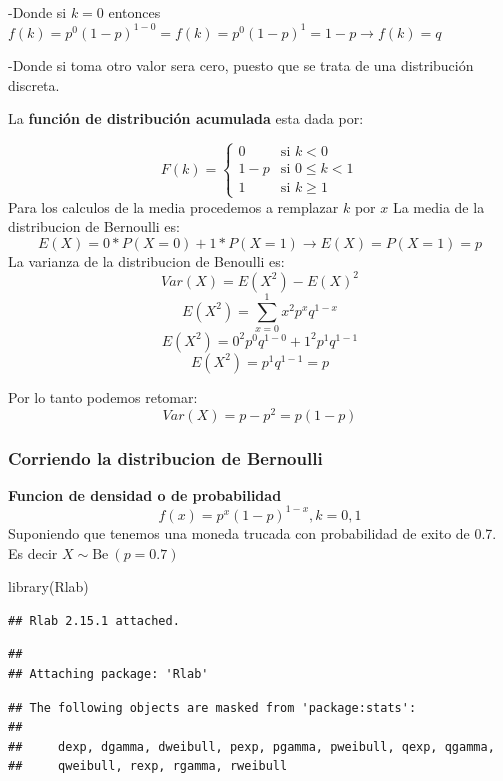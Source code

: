 \documentclass[
]{article}
\newenvironment{Shaded}{\begin{snugshade}}{\end{snugshade}}
\newcommand{\FunctionTok}[1]{\textcolor[rgb]{0.00,0.00,0.00}{#1}}
\newcommand{\NormalTok}[1]{#1}
\begin{document}
-Donde si \(k=0\) entonces
\(f(k)=p^0(1-p)^{1-0}=f(k)=p^0(1-p)^{1}=1-p\longrightarrow f(k)=q\)

-Donde si toma otro valor sera cero, puesto que se trata de una
distribución discreta.

La \textbf{función de distribución acumulada} esta dada por:

\[F(k) = \left\{
\begin{array}{rl}
     0 & \text{si } k<0 
  \\ 1-p & \text{si } 0\le k<1
  \\ 1 & \text{si } k\ge 1
\end{array}
\right.\] Para los calculos de la media procedemos a remplazar \(k\) por
\(x\) La media de la distribucion de Bernoulli es:
\[E(X)=0*P(X=0)+1*P(X=1) \longrightarrow E(X)=P(X=1)=p\] La varianza de
la distribucion de Benoulli es: \[Var(X)=E(X^2)-E(X)^2\]
\[E(X^2)=\sum_{x=0}^1 x^2p^xq^{1-x}\]
\[E(X^2)=0^2p^0q^{1-0}+1^2p^1q^{1-1}\] \[E(X^2)=p^1q^{1-1}=p\]

Por lo tanto podemos retomar: \[Var(X)=p-p^2=p(1-p)\]

\hypertarget{corriendo-la-distribucion-de-bernoulli}{%
\subsubsection{Corriendo la distribucion de
Bernoulli}\label{corriendo-la-distribucion-de-bernoulli}}

\textbf{Funcion de densidad o de probabilidad}
\[f(x)=p^x(1-p)^{1-x}, k={0,1}\] Suponiendo que tenemos una moneda
trucada con probabilidad de exito de 0.7. Es decir
\(X\sim \text{Be}\ (p=0.7)\)

\begin{Shaded}
\begin{Highlighting}[]
\FunctionTok{library}\NormalTok{(Rlab)}
\end{Highlighting}
\end{Shaded}

\begin{verbatim}
## Rlab 2.15.1 attached.
\end{verbatim}

\begin{verbatim}
## 
## Attaching package: 'Rlab'
\end{verbatim}

\begin{verbatim}
## The following objects are masked from 'package:stats':
## 
##     dexp, dgamma, dweibull, pexp, pgamma, pweibull, qexp, qgamma,
##     qweibull, rexp, rgamma, rweibull
\end{verbatim}
\end{document}
